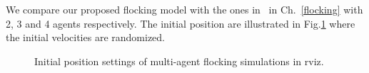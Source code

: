 We compare our proposed flocking model with the ones in~\cite{Vicsek1995,CuckerSmale2007,CuckerDong2010} in Ch.~\ref{flocking} with 2, 3 and 4 agents respectively. The initial position are illustrated in Fig.\ref{fig:simulate_flocking} where the initial velocities are randomized.
\begin{figure}[H]
  \centering
  \caption{Initial position settings of multi-agent flocking simulations in rviz.}\label{fig:simulate_flocking}
\end{figure}

